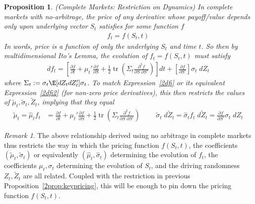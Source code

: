 \documentclass[12pt]{article}
\theoremstyle{plain}
\newtheorem{prop}[thm]{Proposition}
\theoremstyle{definition}
\theoremstyle{remark}
\newtheorem*{rmk}{Remark}
\newcommand{\trace}{\operatorname{tr}}
\begin{document}
\begin{prop}
\label{2prop:complete}
\emph{(Complete Markets: Restriction on Dynamics)}
In complete markets with no-arbitrage, the price of any derivative whose
payoff/value depends only upon underlying vector $S_t$ satisfies for
some function $f$
\begin{align}
  f_t=f(S_t,t)
  \label{2pricingfcn}
\end{align}
In words, price is a function of only the underlying $S_t$ and time
$t$.
So then by multidimensional Ito's Lemma, the evolution of $f_t=f(S_t,t)$
must satisfy
\begin{align}
  df_t
  =
    \left[
      \frac{\partial f}{\partial t}
      +
      \mu_t'
      \frac{\partial f}{\partial S}
      +
      \frac{1}{2}
      \trace\left(
      \Sigma_t
      \frac{\partial^2 f}{\partial S\;\partial S'}
      \right)
    \right]
  dt
  +
    \left[
    \frac{\partial f}{\partial S'}
    \right]
    \sigma_t
  \;dZ_t
\end{align}
where $\Sigma_t := \sigma_t\E[dZ_tdZ_t']\sigma_t$.
To match Expression~\ref{2dfi} or its equivalent Expression~\ref{2dfi2}
(for non-zero price derivatives), this then restricts the values of
$\tilde{\mu}_t,\tilde{\sigma}_t,\tilde{Z}_t$, implying that they equal
\begin{align*}
  \tilde{\mu}_t
  =
  \hat{\mu}_t
  f_t
  &=
  \frac{\partial f}{\partial t}
  +
  \mu_t'
  \frac{\partial f}{\partial S}
  +
  \frac{1}{2}
  \trace\left(
  \Sigma_t
  \frac{\partial^2 f}{\partial S\;\partial S'}
  \right)
  \qquad
  \;
  \tilde{\sigma}_t\;d\tilde{Z}_t
  =
  \hat{\sigma}_t
  f_t\;d\tilde{Z}_t
  =
  \frac{\partial f}{\partial S'}
  \sigma_t
  \;dZ_t
\end{align*}
\end{prop}
\begin{rmk}
The above relationship derived using no arbitrage in complete markets
thus restricts the way in which the pricing function $f(S_t,t)$, the
coefficients $(\tilde{\mu}_t,\tilde{\sigma}_t)$ or equivalently
$(\hat{\mu}_t,\hat{\sigma}_t)$ determining the evolution of $f_t$, the
coefficients $\mu_t,\sigma_t$ determining the evolution of $S_t$, and
the driving randomness $Z_t,\tilde{Z}_t$ are all related.  Coupled with
the restriction in previous Proposition~\ref{2prop:keypricing}, this will
be enough to pin down the pricing function $f(S_t,t)$.
\end{rmk}
\end{document}
